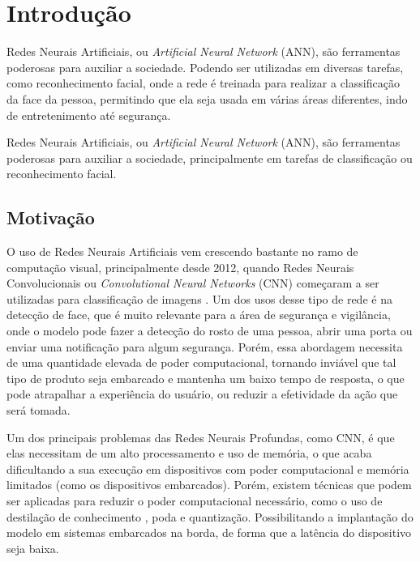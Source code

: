 \chapter{Introdução}

Redes Neurais Artificiais, ou \textit{Artificial Neural Network} (ANN), são ferramentas poderosas para auxiliar a
sociedade.
Podendo ser utilizadas em diversas tarefas, como reconhecimento facial, onde a rede é treinada para realizar a
classificação da face da pessoa, permitindo que ela seja usada em várias áreas diferentes, indo de entretenimento até
segurança.

Redes Neurais Artificiais, ou \textit{Artificial Neural Network} (ANN), são ferramentas poderosas para auxiliar a sociedade,
principalmente em tarefas de classificação ou reconhecimento facial.


\section{Motivação}
O uso de Redes Neurais Artificiais vem crescendo bastante no ramo de computação visual, principalmente desde 2012,
quando Redes Neurais Convolucionais ou \textit{Convolutional Neural Networks} (CNN) começaram a ser utilizadas para
classificação de imagens \cite{alexnet}.
Um dos usos desse tipo de rede é na detecção de face, que é muito relevante para a área de segurança e
vigilância, onde o modelo pode fazer a detecção do rosto de uma pessoa, abrir uma porta ou enviar uma notificação
para algum segurança.
Porém, essa abordagem necessita de uma quantidade elevada de poder computacional, tornando inviável que tal tipo de
produto seja embarcado e mantenha um baixo tempo de resposta, o que pode atrapalhar a experiência do usuário, ou
reduzir a efetividade da ação que será tomada.

Um dos principais problemas das Redes Neurais Profundas, como CNN, é que elas necessitam de um alto processamento e uso
de memória, o que acaba dificultando a sua execução em dispositivos com poder computacional e memória limitados (como os dispositivos embarcados).
Porém, existem técnicas que podem ser aplicadas para reduzir o poder computacional necessário, como o uso de
destilação de conhecimento \cite{hinton2015distilling}, poda e quantização.
Possibilitando a implantação do modelo em sistemas embarcados na borda, de forma que a latência do dispositivo seja
baixa.

